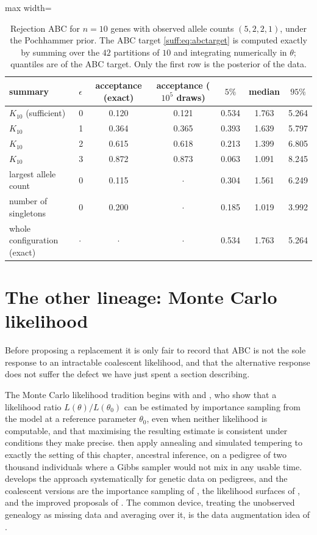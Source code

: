 \begin{table}[t]
\centering
\begin{adjustbox}{max width=\textwidth}
\begin{tabular}{llccccc}
\toprule
summary & $\epsilon$ & acceptance (exact) & acceptance ($10^5$ draws) & $5\%$ & median & $95\%$ \\
\midrule
$K_{10}$ (sufficient) & 0 & 0.120 & 0.121 & 0.534 & 1.763 & 5.264 \\
$K_{10}$ & 1 & 0.364 & 0.365 & 0.393 & 1.639 & 5.797 \\
$K_{10}$ & 2 & 0.615 & 0.618 & 0.213 & 1.399 & 6.805 \\
$K_{10}$ & 3 & 0.872 & 0.873 & 0.063 & 1.091 & 8.245 \\
largest allele count & 0 & 0.115 & $\cdot$ & 0.304 & 1.561 & 6.249 \\
number of singletons & 0 & 0.200 & $\cdot$ & 0.185 & 1.019 & 3.992 \\
\midrule
whole configuration (exact) & $\cdot$ & $\cdot$ & $\cdot$ & 0.534 & 1.763 & 5.264 \\
\bottomrule
\end{tabular}
\end{adjustbox}
\caption{Rejection ABC for $n=10$ genes with observed allele counts $(5,2,2,1)$, under the
Pochhammer prior. The ABC target \eqref{suff:eq:abctarget} is computed exactly by summing
over the $42$ partitions of $10$ and integrating numerically in $\theta$; quantiles are of
the ABC target. Only the first row is the posterior of the data.}
\label{suff:tab:abcesf}
\end{table}

\section{The other lineage: Monte Carlo likelihood}
\label{suff:sec:mcml}

Before proposing a replacement it is only fair to record that ABC is not the sole response to
an intractable coalescent likelihood, and that the alternative response does not suffer the
defect we have just spent a section describing.

The Monte Carlo likelihood tradition begins with \citet{suff:geyerthompson1992} and
\citet{suff:geyer1994}, who show that a likelihood ratio $L(\theta)/L(\theta_0)$ can be
estimated by importance sampling from the model at a reference parameter $\theta_0$, even
when neither likelihood is computable, and that maximising the resulting estimate is
consistent under conditions they make precise. \citet{suff:geyerthompson1995} then apply
annealing and simulated tempering to exactly the setting of this chapter, ancestral
inference, on a pedigree of two thousand individuals where a Gibbs sampler would not mix in
any usable time. \citet{suff:thompson1994,suff:thompson2000} develops the approach
systematically for genetic data on pedigrees, and the coalescent versions are the importance
sampling of \citet{suff:griffithstavare1994}, the likelihood surfaces of
\citet{suff:kuhner1995}, and the improved proposals of \citet{suff:stephensdonnelly2000}. The
common device, treating the unobserved genealogy as missing data and averaging over it, is
the data augmentation idea of \citet{suff:tannerwong1987}.

